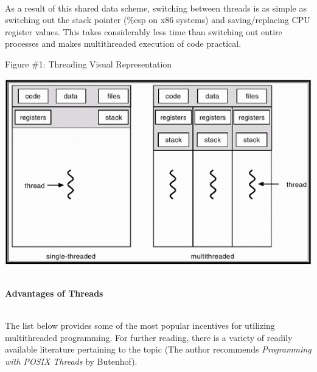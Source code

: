 \documentclass[12pt]{extarticle}
\newenvironment{myindentpar}[1]%
 {\begin{list}{}%
         {\setlength{\leftmargin}{#1}}%
         \item[]%
 }
 {\end{list}}
\begin{document}
\begin{myindentpar}{5mm}
    \ \\
    As a result of this shared data scheme, switching between threads is as simple as switching out the stack pointer (\%esp on x86 systems) and saving/replacing CPU register values.  This takes considerably less time than switching out entire processes and makes multithreaded execution of code practical.
    
    \begin{center}
        Figure \#1: Threading Visual Representation
    \end{center}
    \vspace{-6mm}
    \begin{center}
        \includegraphics{threading.png}
    \end{center}

    \ \\
    \textbf{Advantages of Threads}
    
    \ \\
    The list below provides some of the most popular incentives for utilizing multithreaded programming.  For further reading, there is a variety of readily available literature pertaining to the topic (The author recommends \textit{Programming with POSIX Threads} by Butenhof).  
    
    \begin{itemize}
        \setlength\itemsep{-0.1em}
        

\end{itemize}
\end{myindentpar}
\end{document}
